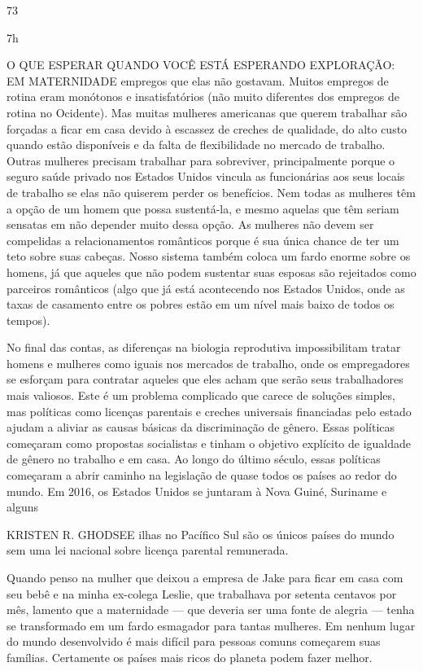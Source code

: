  \par 
73
 \par 
7h
 \par 
O QUE ESPERAR QUANDO VOCÊ ESTÁ ESPERANDO EXPLORAÇÃO: EM MATERNIDADE empregos que elas não gostavam. Muitos empregos de rotina eram monótonos e insatisfatórios (não muito diferentes dos empregos de rotina no Ocidente). Mas muitas mulheres americanas que querem trabalhar são forçadas a ficar em casa devido à escassez de creches de qualidade, do alto custo quando estão disponíveis e da falta de flexibilidade no mercado de trabalho. Outras mulheres precisam trabalhar para sobreviver, principalmente porque o seguro saúde privado nos Estados Unidos vincula as funcionárias aos seus locais de trabalho se elas não quiserem perder os benefícios. Nem todas as mulheres têm a opção de um homem que possa sustentá-la, e mesmo aquelas que têm seriam sensatas em não depender muito dessa opção. As mulheres não devem ser compelidas a relacionamentos românticos porque é sua única chance de ter um teto sobre suas cabeças. Nosso sistema também coloca um fardo enorme sobre os homens, já que aqueles que não podem sustentar suas esposas são rejeitados como parceiros românticos (algo que já está acontecendo nos Estados Unidos, onde as taxas de casamento entre os pobres estão em um nível mais baixo de todos os tempos).
 \par 
No final das contas, as diferenças na biologia reprodutiva impossibilitam tratar homens e mulheres como iguais nos mercados de trabalho, onde os empregadores se esforçam para contratar aqueles que eles acham que serão seus trabalhadores mais valiosos. Este é um problema complicado que carece de soluções simples, mas políticas como licenças parentais e creches universais financiadas pelo estado ajudam a aliviar as causas básicas da discriminação de gênero. Essas políticas começaram como propostas socialistas e tinham o objetivo explícito de igualdade de gênero no trabalho e em casa. Ao longo do último século, essas políticas começaram a abrir caminho na legislação de quase todos os países ao redor do mundo. Em 2016, os Estados Unidos se juntaram à Nova Guiné, Suriname e alguns
 \par 
KRISTEN R. GHODSEE ilhas no Pacífico Sul são os únicos países do mundo sem uma lei nacional sobre licença parental remunerada.
 \par 
Quando penso na mulher que deixou a empresa de Jake para ficar em casa com seu bebê e na minha ex-colega Leslie, que trabalhava por setenta centavos por mês, lamento que a maternidade — que deveria ser uma fonte de alegria — tenha se transformado em um fardo esmagador para tantas mulheres. Em nenhum lugar do mundo desenvolvido é mais difícil para pessoas comuns começarem suas famílias. Certamente os países mais ricos do planeta podem fazer melhor.

